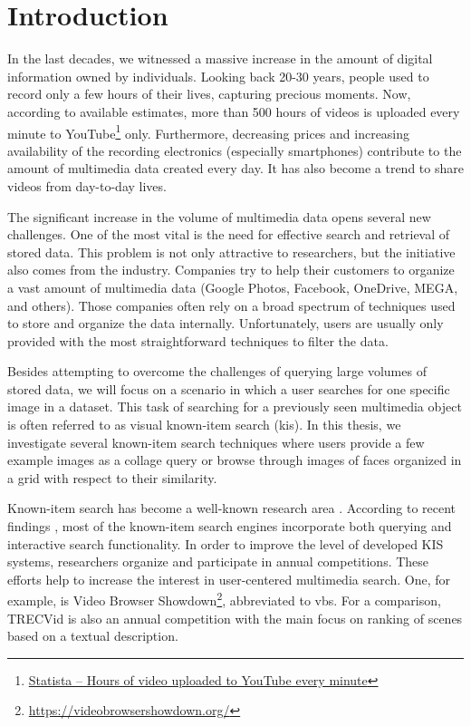 \chapter*{Introduction}

In the last decades, we witnessed a massive increase in the amount of digital information owned by individuals. Looking back 20-30 years, people used to record only a few hours of their lives, capturing precious moments. Now, according to available estimates, more than 500 hours of videos is uploaded every minute  to YouTube\footnote{\href{https://www.statista.com/statistics/259477/hours-of-video-uploaded-to-youtube-every-minute/}{Statista -- Hours of video uploaded to YouTube every minute}} only. Furthermore, decreasing prices and increasing availability of the recording electronics (especially smartphones) contribute to the amount of multimedia data created every day. It has also become a trend to share videos from day-to-day lives.

The significant increase in the volume of multimedia data opens several new challenges. One of the most vital is the need for effective search and retrieval of stored data. This problem is not only attractive to researchers, but the initiative also comes from the industry. Companies try to help their customers to organize a vast amount of multimedia data (Google Photos, Facebook, OneDrive, MEGA, and others). Those companies often rely on a broad spectrum of techniques used to store and organize the data internally. Unfortunately, users are usually only provided with the most straightforward techniques to filter the data.

Besides attempting to overcome the challenges of querying large volumes of stored data, we will focus on a scenario in which a user searches for one specific image in a dataset. This task of searching for a previously seen multimedia object is often referred to as visual known-item search (\acrshort{kis}). In this thesis, we investigate several known-item search techniques where users provide a few example images as a collage query or browse through images of faces organized in a grid with respect to their similarity.

Known-item search has become a well-known research area \citep{8352047}. According to recent findings \citep{9037125}, most of the known-item search engines incorporate both querying and interactive search functionality. In order to improve the level of developed KIS systems, researchers organize and participate in annual competitions. These efforts help to increase the interest in user-centered multimedia search. One, for example, is Video Browser Showdown\footnote{\url{https://videobrowsershowdown.org/}}, abbreviated to \acrshort{vbs}. For a comparison, TRECVid \citep{2019trecvidawad} is also an annual competition with the main focus on ranking of scenes based on a textual description.

